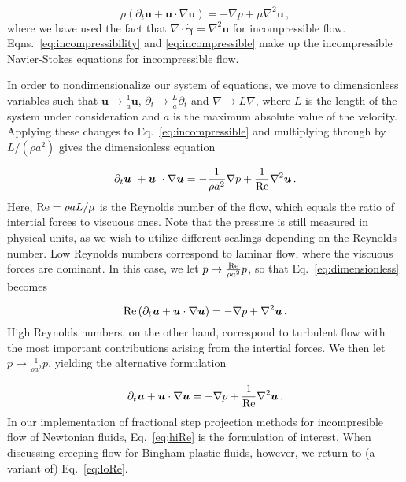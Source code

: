 \documentclass[final,3p,twocolumn]{elsarticle}
\begin{document}
\begin{equation}
    \rho \left( \partial_t \bm{u} + \bm{u} \cdot \nabla \bm{u} \right) 
    = - \nabla p + \mu \nabla^2 \bm{u} \,,
    \label{eq:incompressible}
\end{equation}
%
where we have used the fact that $\nabla \cdot \dot{\bm{\gamma}} = \nabla^2
\bm{u}$ for incompressible flow. Eqns.\ \eqref{eq:incompressibility} and
\eqref{eq:incompressible} make up the incompressible Navier-Stokes equations
for incompressible flow. 

In order to nondimensionalize our system of equations, we move to dimensionless
variables such that $\bm{u} \rightarrow \frac{1}{a} \bm{u}$, $\partial_t \rightarrow
\frac{L}{a} \partial_t$ and $\nabla \rightarrow L \nabla$, where $L$ is
the length of the system under consideration and $a$ is the maximum absolute
value of the velocity. Applying these changes to Eq.\ \eqref{eq:incompressible}
and multiplying through by $L/(\rho a^2)$ gives the dimensionless equation 

\begin{equation}
    \partial_t \bm{u} + \bm{u} \cdot \nabla \bm{u} = - \frac{1}{\rho a^2}
    \nabla p + \frac{1}{\rm Re} \nabla^2 \bm{u} \,.
    \label{eq:dimensionless}
\end{equation}
%
Here, ${\rm Re} = \rho a L / \mu$ is the Reynolds number of the flow, which
equals the ratio of intertial forces to viscuous ones. Note that the pressure
is still measured in physical units, as we wish to utilize different scalings
depending on the Reynolds number. Low Reynolds numbers correspond to laminar
flow, where the viscuous forces are dominant. In this case, we let $p
\rightarrow \frac{\rm Re}{\rho a^2} p$, so that Eq.\ \eqref{eq:dimensionless}
becomes

\begin{equation}
    {\rm Re} \left( \partial_t \bm{u} + \bm{u} \cdot \nabla \bm{u} \right)  = -
    \nabla p + \nabla^2 \bm {u} \,.
    \label{eq:loRe}
\end{equation}
%
High Reynolds numbers, on the other hand, correspond to turbulent flow with the
most important contributions arising from the intertial forces. We then let $p
\rightarrow \frac{1}{\rho a^2} p$, yielding the alternative formulation 

\begin{equation}
    \partial_t \bm{u} + \bm{u} \cdot \nabla \bm{u} = - \nabla p
    + \frac{1}{\rm Re} \nabla^2 \bm {u} \,.
    \label{eq:hiRe}
\end{equation}
%
In our implementation of fractional step projection methods for incompresible
flow of Newtonian fluids, Eq.\ \eqref{eq:hiRe} is the formulation of interest.
When discussing creeping flow for Bingham plastic fluids, however, we return to
(a variant of) Eq.\ \eqref{eq:loRe}. 
\end{document}
